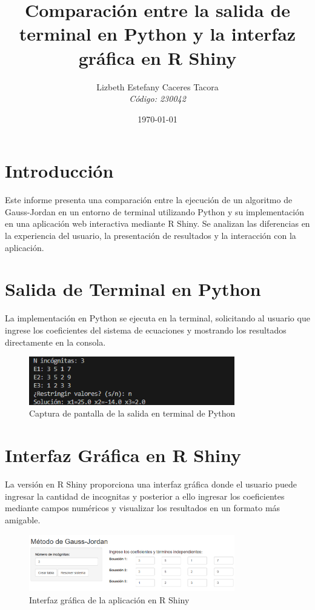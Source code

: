 \documentclass[12pt]{article}
\title{Comparación entre la salida de terminal en Python y la interfaz gráfica en R Shiny}
\author{Lizbeth Estefany Caceres Tacora \\ \textit{Código: 230042}}
\date{\today}
\begin{document}
\maketitle

\section*{Introducción}
Este informe presenta una comparación entre la ejecución de un algoritmo de Gauss-Jordan en un entorno de terminal utilizando Python y su implementación en una aplicación web interactiva mediante R Shiny. Se analizan las diferencias en la experiencia del usuario, la presentación de resultados y la interacción con la aplicación.

\section{Salida de Terminal en Python}

La implementación en Python se ejecuta en la terminal, solicitando al usuario que ingrese los coeficientes del sistema de ecuaciones y mostrando los resultados directamente en la consola.



\begin{figure}[H]
    \centering
    \includegraphics[width=0.8\textwidth]{salida_terminal.png}
    \caption{Captura de pantalla de la salida en terminal de Python}
    \label{fig:python_terminal}
\end{figure}

\section{Interfaz Gráfica en R Shiny}

La versión en R Shiny proporciona una interfaz gráfica donde el usuario puede ingresar la cantidad de incognitas y posterior a ello ingresar los coeficientes mediante campos numéricos y visualizar los resultados en un formato más amigable.

\begin{figure}[H]
    \centering
    \includegraphics[width=0.8\textwidth]{r_interfaz.png}
    \caption{Interfaz gráfica de la aplicación en R Shiny}
    \label{fig:r_shiny_interface}
\end{figure}
\end{document}
